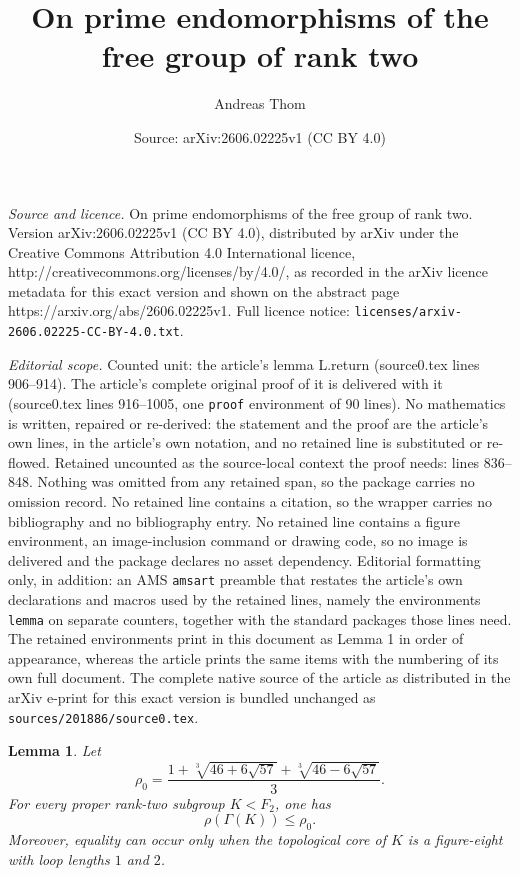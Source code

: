 \documentclass[10pt,a4paper]{amsart}
\title{On prime endomorphisms of the free group of rank two}
\author{Andreas Thom}
\date{Source: arXiv:2606.02225v1 (CC BY 4.0)}
\newtheorem{lemma}{Lemma}
\begin{document}
\maketitle

\noindent\emph{Source and licence.} On prime endomorphisms of the free group of rank two. Version arXiv:2606.02225v1 (CC BY 4.0), distributed by arXiv under the Creative Commons Attribution 4.0 International licence, http://creativecommons.org/licenses/by/4.0/, as recorded in the arXiv licence metadata for this exact version and shown on the abstract page https://arxiv.org/abs/2606.02225v1. Full licence notice: \texttt{licenses/arxiv-2606.02225-CC-BY-4.0.txt}.\par\smallskip

\noindent\textit{Editorial scope.} Counted unit: the article's lemma L.return (source0.tex lines 906--914). The article's complete original proof of it is delivered with it (source0.tex lines 916--1005, one \texttt{proof} environment of 90 lines). No mathematics is written, repaired or re-derived: the statement and the proof are the article's own lines, in the article's own notation, and no retained line is substituted or re-flowed.  Retained uncounted as the source-local context the proof needs: lines 836--848.  Nothing was omitted from any retained span, so the package carries no omission record.  No retained line contains a citation, so the wrapper carries no bibliography and no bibliography entry.  No retained line contains a figure environment, an image-inclusion command or drawing code, so no image is delivered and the package declares no asset dependency.  Editorial formatting only, in addition: an AMS \texttt{amsart} preamble that restates the article's own declarations and macros used by the retained lines, namely the environments \texttt{lemma} on separate counters, together with the standard packages those lines need.  The retained environments print in this document as Lemma 1 in order of appearance, whereas the article prints the same items with the numbering of its own full document.  The complete native source of the article as distributed in the arXiv e-print for this exact version is bundled unchanged as \texttt{sources/201886/source0.tex}.
\begin{lemma}\label{L.sharp-cogrowth}
Let
\[
        \rho_0=
        \frac{1+\sqrt[3]{46+6\sqrt{57}}+\sqrt[3]{46-6\sqrt{57}}}{3}.
\]
For every proper rank-two subgroup $K<F_2$, one has
\[
        \rho(\Gamma(K))\leq \rho_0.
\]
Moreover, equality can occur only when the topological core of $K$ is a
figure-eight with loop lengths $1$ and $2$.
\end{lemma}
\end{document}
